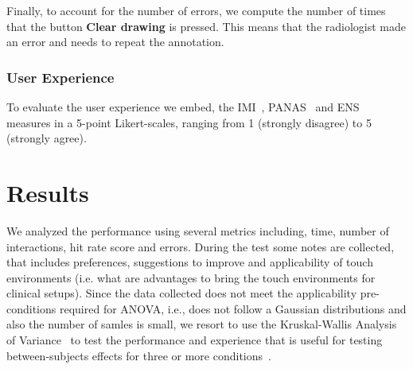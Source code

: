 \documentclass{sigchi}
\begin{document}
Finally, to account for the number of errors, we compute the number of times that the button \textbf{Clear drawing} is pressed. This means that the radiologist made an error and needs to repeat the
annotation.

\subsubsection{User Experience}


To evaluate the user experience we embed, the IMI~\cite{ryan1982control}, PANAS~\cite{watson1999panas}
and ENS~\cite{broeck2010capturing} measures in a 5-point Likert-scales,  ranging from 1 (strongly disagree) to 5 (strongly agree). 



\section{Results}

We analyzed the performance using several metrics including, time, number of interactions, hit rate score and errors. During the test some notes are collected, that includes preferences, suggestions to improve and applicability of touch environments (i.e. what are advantages to bring the touch environments for clinical setups). Since the data collected does not meet the applicability pre-conditions required for ANOVA, i.e., 
does not follow a Gaussian distributions and also the number of samles is small, we resort to use the Kruskal-Wallis Analysis of Variance~\cite{theodorsson1986kruskal} to test the performance and experience that is useful for testing between-subjects effects for three or more conditions~\cite{mcfarlane2002comparison}.
\end{document}
